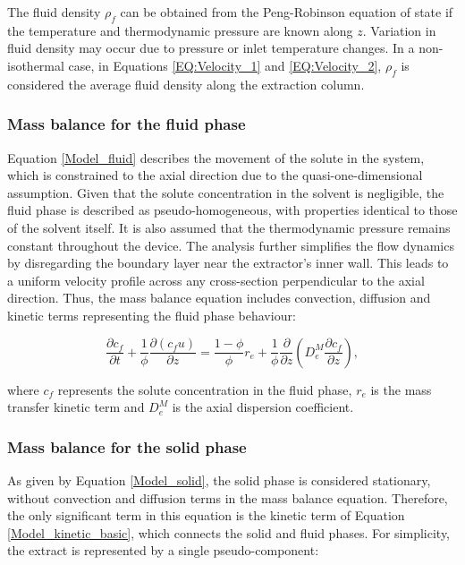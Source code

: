 \documentclass[a4paper,fleqn]{cas-dc}
\begin{document}
	The fluid density $\rho_f$ can be obtained from the Peng-Robinson equation of state if the temperature and thermodynamic pressure are known along $z$. Variation in fluid density may occur due to pressure or inlet temperature changes. In a non-isothermal case, in Equations \ref{EQ:Velocity_1} and \ref{EQ:Velocity_2}, $\rho_f$ is considered the average fluid density along the extraction column.
	
	\subsubsection{Mass balance for the fluid phase} \label{CH: Mass_balance_fluid}
	
	Equation \ref{Model_fluid} describes the movement of the solute in the system, which is constrained to the axial direction due to the quasi-one-dimensional assumption. Given that the solute concentration in the solvent is negligible, the fluid phase is described as pseudo-homogeneous, with properties identical to those of the solvent itself. It is also assumed that the thermodynamic pressure remains constant throughout the device. The analysis further simplifies the flow dynamics by disregarding the boundary layer near the extractor's inner wall. This leads to a uniform velocity profile across any cross-section perpendicular to the axial direction. Thus, the mass balance equation includes convection, diffusion and kinetic terms representing the fluid phase behaviour:
	
	{\footnotesize
		\begin{equation}
			\label{Model_fluid}
			\frac{\partial c_f}{\partial t}
			+ \frac{1}{\phi} \frac{\partial \left( c_f u\right)}{\partial z}
			= \frac{1-\phi}{\phi} r_e
			+ \frac{1}{\phi} \frac{\partial}{\partial z} \left( D^M_e \frac{\partial c_f}{\partial z} \right),
		\end{equation}
	}
	
	where $c_f$ represents the solute concentration in the fluid phase, $r_e$ is the mass transfer kinetic term and $D^M_e$ is the {\color{blue}axial dispersion coefficient}.
	
	\subsubsection{Mass balance for the solid phase} \label{Mass_balance_solid}
	
	As given by Equation \ref{Model_solid}, the solid phase is considered stationary, without convection and diffusion terms in the mass balance equation. Therefore, the only significant term in this equation is the kinetic term of Equation \ref{Model_kinetic_basic}, which connects the solid and fluid phases. For simplicity, the extract is represented by a single pseudo-component: 
	
\end{document}
